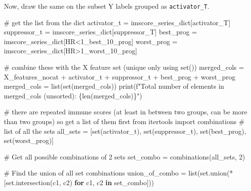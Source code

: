 \documentclass[
  letterpaper,
  DIV=11,
  numbers=noendperiod]{scrartcl}
\newenvironment{Shaded}{\begin{snugshade}}{\end{snugshade}}
\newcommand{\BuiltInTok}[1]{\textcolor[rgb]{0.00,0.23,0.31}{#1}}
\newcommand{\CommentTok}[1]{\textcolor[rgb]{0.37,0.37,0.37}{#1}}
\newcommand{\ControlFlowTok}[1]{\textcolor[rgb]{0.00,0.23,0.31}{\textbf{#1}}}
\newcommand{\DecValTok}[1]{\textcolor[rgb]{0.68,0.00,0.00}{#1}}
\newcommand{\ImportTok}[1]{\textcolor[rgb]{0.00,0.46,0.62}{#1}}
\newcommand{\KeywordTok}[1]{\textcolor[rgb]{0.00,0.23,0.31}{\textbf{#1}}}
\newcommand{\NormalTok}[1]{\textcolor[rgb]{0.00,0.23,0.31}{#1}}
\newcommand{\OperatorTok}[1]{\textcolor[rgb]{0.37,0.37,0.37}{#1}}
\newcommand{\SpecialCharTok}[1]{\textcolor[rgb]{0.37,0.37,0.37}{#1}}
\newcommand{\SpecialStringTok}[1]{\textcolor[rgb]{0.13,0.47,0.30}{#1}}
\newcommand{\StringTok}[1]{\textcolor[rgb]{0.13,0.47,0.30}{#1}}
\begin{document}
Now, draw the same on the subset Y labels grouped as
\texttt{activator\_T}.

\begin{Shaded}
\begin{Highlighting}[]
\CommentTok{\# get the list from the dict}
\NormalTok{activator\_t }\OperatorTok{=}\NormalTok{ imscore\_series\_dict[}\StringTok{\textquotesingle{}activator\_T\textquotesingle{}}\NormalTok{]}
\NormalTok{suppressor\_t }\OperatorTok{=}\NormalTok{ imscore\_series\_dict[}\StringTok{\textquotesingle{}suppressor\_T\textquotesingle{}}\NormalTok{]}
\NormalTok{best\_prog }\OperatorTok{=}\NormalTok{ imscore\_series\_dict[}\StringTok{\textquotesingle{}HR\textless{}1\_best\_10\_prog\textquotesingle{}}\NormalTok{]}
\NormalTok{worst\_prog }\OperatorTok{=}\NormalTok{ imscore\_series\_dict[}\StringTok{\textquotesingle{}HR\textgreater{}1\_worst\_10\_prog\textquotesingle{}}\NormalTok{]}

\CommentTok{\# combine these with the X feature set (unique only using set())}
\NormalTok{merged\_cols }\OperatorTok{=}\NormalTok{ X\_features\_nocat }\OperatorTok{+}\NormalTok{ activator\_t }\OperatorTok{+}\NormalTok{ suppressor\_t }\OperatorTok{+}\NormalTok{ best\_prog }\OperatorTok{+}\NormalTok{ worst\_prog}
\NormalTok{merged\_cols }\OperatorTok{=} \BuiltInTok{list}\NormalTok{(}\BuiltInTok{set}\NormalTok{(merged\_cols))}
\BuiltInTok{print}\NormalTok{(}\SpecialStringTok{f"Total number of elements in merged\_cols (unsorted): }\SpecialCharTok{\{}\BuiltInTok{len}\NormalTok{(merged\_cols)}\SpecialCharTok{\}}\SpecialStringTok{"}\NormalTok{)}

\CommentTok{\# there are repeated immune scores (at least in between two groups, can be more than two groups) so get a list of them first}
\ImportTok{from}\NormalTok{ itertools }\ImportTok{import}\NormalTok{ combinations}
\CommentTok{\# list of all the sets}
\NormalTok{all\_sets }\OperatorTok{=}\NormalTok{ [}\BuiltInTok{set}\NormalTok{(activator\_t), }\BuiltInTok{set}\NormalTok{(suppressor\_t), }\BuiltInTok{set}\NormalTok{(best\_prog), }\BuiltInTok{set}\NormalTok{(worst\_prog)]}

\CommentTok{\# Get all possible combinations of 2 sets}
\NormalTok{set\_combo }\OperatorTok{=}\NormalTok{ combinations(all\_sets, }\DecValTok{2}\NormalTok{)}

\CommentTok{\# Find the union of all set combinations}
\NormalTok{union\_of\_combo }\OperatorTok{=} \BuiltInTok{list}\NormalTok{(}\BuiltInTok{set}\NormalTok{.union(}\OperatorTok{*}\NormalTok{[}\BuiltInTok{set}\NormalTok{.intersection(c1, c2) }\ControlFlowTok{for}\NormalTok{ c1, c2 }\KeywordTok{in}\NormalTok{ set\_combo]))}


\end{Highlighting}
\end{Shaded}
\end{document}
